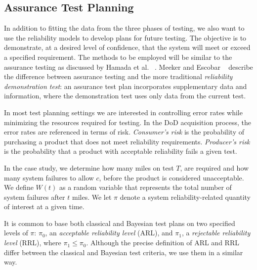 \documentclass[12pt]{article}
\begin{document}
\subsection{Assurance Test Planning}\label{atp}
In addition to fitting the data from the three phases of testing, we also want to use the reliability models to
develop plans for future testing. The objective is to demonstrate, at a desired level of confidence, that the system will meet or exceed a specified requirement. The methods to be employed will be similar to the assurance testing
as discussed by Hamada et al. ~\cite{ref6}.
Meeker and Escobar
~\cite{ref7} describe the difference between assurance testing and the more traditional
\emph{reliability demonstration test}: an assurance
test plan incorporates supplementary data and information, where the demonstration test uses only data from the current test.

In most test planning settings we are interested in controlling error rates
while minimizing the resources required for testing.  In the DoD acquisition
process, the error rates are referenced in terms of risk. \emph{Consumer's
risk} is the probability of purchasing a product that does not meet
reliability requirements.  \emph{Producer's risk} is the probability that a
product with acceptable reliability fails a given test.

In the case study, we determine how many miles on test $T$, are required and how many system failures to allow $c$, before the product is considered unacceptable.  We define $W(t)$ as a random variable that represents the total number of system failures after $t$ miles.  We let $\pi$ denote a system reliability-related
quantity of interest at a given time.

It is common to base both classical and Bayesian test plans on two specified levels
of $\pi$: $\pi_0$, an \emph{acceptable reliability level} (ARL), and $\pi_1$, a
\emph{rejectable reliability level} (RRL), where $\pi_1 \leq  \pi_0$. Although
the precise definition of ARL and RRL differ between the classical and Bayesian
test criteria, we use them in a similar way.
\end{document}
